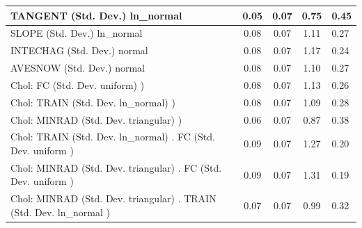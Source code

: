 \begin{table}
\begin{center}
\begin{tabular}{|l|l|c|c|c|l|}
			\hline
			TANGENT (Std. Dev.) ln_normal &  & 0.05 & 0.07 & 0.75 & 0.45 \\
			\hline
			SLOPE (Std. Dev.) ln_normal &  & 0.08 & 0.07 & 1.11 & 0.27 \\
			\hline
			INTECHAG (Std. Dev.) normal &  & 0.08 & 0.07 & 1.17 & 0.24 \\
			\hline
			AVESNOW (Std. Dev.) normal &  & 0.08 & 0.07 & 1.10 & 0.27 \\
			\hline
			 Chol: FC (Std. Dev. uniform) ) &  & 0.08 & 0.07 & 1.13 & 0.26 \\
			\hline
			 Chol: TRAIN (Std. Dev. ln_normal) ) &  & 0.08 & 0.07 & 1.09 & 0.28 \\
			\hline
			 Chol: MINRAD (Std. Dev. triangular) ) &  & 0.06 & 0.07 & 0.87 & 0.38 \\
			\hline
			 Chol: TRAIN (Std. Dev. ln_normal) . FC (Std. Dev.   uniform ) &  & 0.09 & 0.07 & 1.27 & 0.20 \\
			\hline
			 Chol: MINRAD (Std. Dev. triangular) . FC (Std. Dev.   uniform ) &  & 0.09 & 0.07 & 1.31 & 0.19 \\
			\hline
			 Chol: MINRAD (Std. Dev. triangular) . TRAIN (Std. Dev.   ln_normal ) &  & 0.07 & 0.07 & 0.99 & 0.32 \\
			\hline
		\end{tabular}
	\end{center}
\end{table}